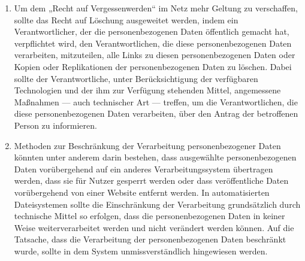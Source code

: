 \begin{enumerate}

   \item Um dem „Recht auf Vergessenwerden“ im Netz mehr Geltung zu verschaffen, sollte das Recht auf Löschung
    ausgeweitet werden, indem ein Verantwortlicher, der die personenbezogenen Daten öffentlich gemacht hat,
    verpflichtet wird, den Verantwortlichen, die diese personenbezogenen Daten verarbeiten, mitzuteilen, alle Links zu
    diesen personenbezogenen Daten oder Kopien oder Replikationen der personenbezogenen Daten zu löschen. Dabei sollte
    der Verantwortliche, unter Berücksichtigung der verfügbaren Technologien und der ihm zur Verfügung stehenden
    Mittel, angemessene Maßnahmen — auch technischer Art — treffen, um die Verantwortlichen, die diese
    personenbezogenen Daten verarbeiten, über den Antrag der betroffenen Person zu informieren.%
   \label{itm:eg-66}
   

   \item Methoden zur Beschränkung der Verarbeitung personenbezogener Daten könnten unter anderem darin bestehen, dass
    ausgewählte personenbezogenen Daten vorübergehend auf ein anderes Verarbeitungssystem übertragen werden, dass sie
    für Nutzer gesperrt werden oder dass veröffentliche Daten vorübergehend von einer Website entfernt werden. In
    automatisierten Dateisystemen sollte die Einschränkung der Verarbeitung grundsätzlich durch technische Mittel so
    erfolgen, dass die personenbezogenen Daten in keiner Weise weiterverarbeitet werden und nicht verändert werden
    können. Auf die Tatsache, dass die Verarbeitung der personenbezogenen Daten beschränkt wurde, sollte in dem System
    unmissverständlich hingewiesen werden.%
   \label{itm:eg-67}
   


\end{enumerate}
